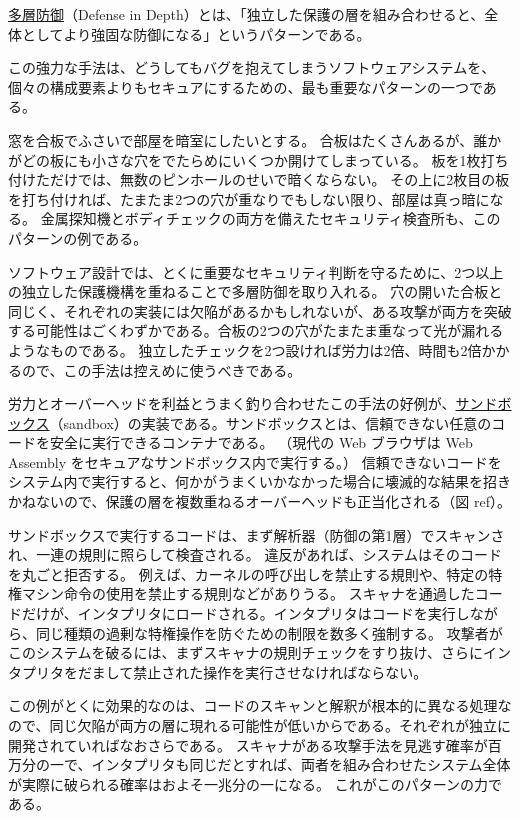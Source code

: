 \documentclass[uplatex]{jsarticle}
\def\ref#1{ref}%
\def\label#1{}%
\begin{document}
\begin{dfn}[多層防御]\label{dfn:ch4-defense-in-depth}
\underline{多層防御}（Defense in Depth）とは、「独立した保護の層を組み合わせると、全体としてより強固な防御になる」というパターンである。
\end{dfn}

この強力な手法は、どうしてもバグを抱えてしまうソフトウェアシステムを、個々の構成要素よりもセキュアにするための、最も重要なパターンの一つである。

\begin{exa}[穴の開いた合板と暗室]\label{exa:ch4-plywood}
窓を合板でふさいで部屋を暗室にしたいとする。
合板はたくさんあるが、誰かがどの板にも小さな穴をでたらめにいくつか開けてしまっている。
板を1枚打ち付けただけでは、無数のピンホールのせいで暗くならない。
その上に2枚目の板を打ち付ければ、たまたま2つの穴が重なりでもしない限り、部屋は真っ暗になる。
金属探知機とボディチェックの両方を備えたセキュリティ検査所も、このパターンの例である。
\end{exa}

ソフトウェア設計では、とくに重要なセキュリティ判断を守るために、2つ以上の独立した保護機構を重ねることで多層防御を取り入れる。
穴の開いた合板と同じく、それぞれの実装には欠陥があるかもしれないが、ある攻撃が両方を突破する可能性はごくわずかである。合板の2つの穴がたまたま重なって光が漏れるようなものである。
独立したチェックを2つ設ければ労力は2倍、時間も2倍かかるので、この手法は控えめに使うべきである。

\begin{exa}[サンドボックス]\label{exa:ch4-sandbox}
労力とオーバーヘッドを利益とうまく釣り合わせたこの手法の好例が、\underline{サンドボックス}（sandbox）の実装である。サンドボックスとは、信頼できない任意のコードを安全に実行できるコンテナである。
（現代の Web ブラウザは Web Assembly をセキュアなサンドボックス内で実行する。）
信頼できないコードをシステム内で実行すると、何かがうまくいかなかった場合に壊滅的な結果を招きかねないので、保護の層を複数重ねるオーバーヘッドも正当化される（図 \ref{fig:ch4-sandbox}）。

サンドボックスで実行するコードは、まず解析器（防御の第1層）でスキャンされ、一連の規則に照らして検査される。
違反があれば、システムはそのコードを丸ごと拒否する。
例えば、カーネルの呼び出しを禁止する規則や、特定の特権マシン命令の使用を禁止する規則などがありうる。
スキャナを通過したコードだけが、インタプリタにロードされる。インタプリタはコードを実行しながら、同じ種類の過剰な特権操作を防ぐための制限を数多く強制する。
攻撃者がこのシステムを破るには、まずスキャナの規則チェックをすり抜け、さらにインタプリタをだまして禁止された操作を実行させなければならない。

この例がとくに効果的なのは、コードのスキャンと解釈が根本的に異なる処理なので、同じ欠陥が両方の層に現れる可能性が低いからである。それぞれが独立に開発されていればなおさらである。
スキャナがある攻撃手法を見逃す確率が百万分の一で、インタプリタも同じだとすれば、両者を組み合わせたシステム全体が実際に破られる確率はおよそ一兆分の一になる。
これがこのパターンの力である。
\end{exa}
\end{document}

